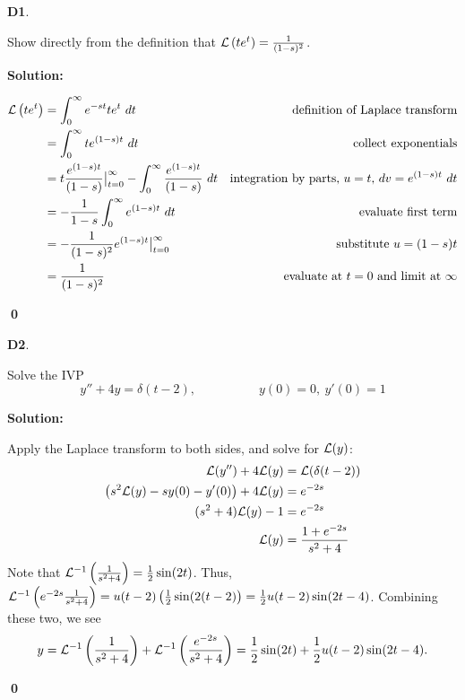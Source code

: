 \documentclass{article}
\newenvironment{problem}[1]
{
  \begin{flushleft}
  \textbf{#1}.
  \ignorespaces
}
{
  \end{flushleft}
}
\newenvironment{solution}
{
  \ignorespaces
  \textbf{Solution:}
}
{
  \ignorespacesafterend
  \begin{flushright}
  {\bfseries \qed}
  \end{flushright}
}
\begin{document}
\begin{problem}{D1}
Show directly from the definition that \(\mathcal{L}\left(te^t\right) = \frac{1}{(1-s)^2}\).
\end{problem}
\begin{solution}
\begin{align*}
\mathcal{L}\left(te^t\right) &= \int _0 ^\infty e^{-st} te^t \ dt & \text{definition of Laplace transform}\\
&=\int _0 ^\infty t e^{(1-s)t}\ dt  & \text{collect exponentials} \\
&= t\frac{e^{(1-s)t}}{(1-s)} \big |_{t=0} ^{\infty} - \int _0 ^\infty \frac{e^{(1-s)t}}{(1-s)}\ dt  & \text{integration by parts, \(u=t\), \(dv= e^{(1-s)t}\ dt\)}\\
&= -\frac{1}{1-s} \int _0 ^\infty e^{(1-s)t}\ dt & \text{evaluate first term}\\
&= -\frac{1}{(1-s)^2} e^{(1-s)t} \big|_{t=0} ^{\infty}  & \text{substitute \(u=(1-s)t\)}\\
&= \frac{1}{(1-s)^2} &\text{evaluate at \(t=0\) and limit at \(\infty\)}
\end{align*}
\end{solution}

\begin{problem}{D2}
Solve the IVP
\[y''+4y=\delta(t-2), \hspace{5em} y(0)=0,\ y'(0)=1\]
\end{problem}
\begin{solution}
Apply the Laplace transform to both sides, and solve for \(\mathcal{L}(y)\):
\begin{align*}
\mathcal{L}(y'')+4\mathcal{L}(y) &= \mathcal{L}(\delta(t-2)) \\
\left( s^2\mathcal{L}(y)-sy(0)-y'(0) \right) + 4 \mathcal{L}(y) &= e^{-2s} \\
(s^2+4)\mathcal{L}(y) -1 &= e^{-2s} \\
\mathcal{L}(y)&= \frac{1+e^{-2s}}{s^2+4}
\end{align*}
Note that \(\mathcal{L}^{-1}\left(\frac{1}{s^2+4}\right) = \frac{1}{2} \sin(2t)\).  Thus, \(\mathcal{L}^{-1}\left(e^{-2s} \frac{1}{s^2+4}\right) = u(t-2) \left(\frac{1}{2} \sin(2(t-2)\right) = \frac{1}{2} u(t-2) \sin(2t-4)\).  Combining these two, we see
\[y = \mathcal{L}^{-1} \left(\frac{1}{s^2+4}\right)+\mathcal{L}^{-1}\left(\frac{e^{-2s}}{s^2+4}\right) = \frac{1}{2}\sin(2t)+\frac{1}{2} u(t-2)\sin(2t-4).\]
\end{solution}
\end{document}
